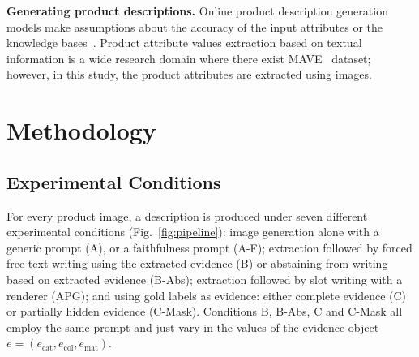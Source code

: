 \documentclass[runningheads]{llncs}
\newcommand{\cond}[1]{\textsf{#1}}
\begin{document}
\textbf{Generating product descriptions.} Online product description generation models make assumptions about the accuracy of the input attributes or the knowledge bases~\cite{chen2019kobe}. Product attribute values extraction based on textual information is a wide research domain where there exist MAVE~\cite{yang2022mave} dataset; however, in this study, the product attributes are extracted using images.
\section{Methodology}\label{sec:method}

\subsection{Experimental Conditions}
For every product image, a description is produced under seven different experimental conditions (Fig.~\ref{fig:pipeline}): image generation alone with a generic prompt (\cond{A}), or a faithfulness prompt (\cond{A-F}); extraction followed by forced free-text writing using the extracted evidence (\cond{B}) or abstaining from writing based on extracted evidence (\cond{B-Abs}); extraction followed by slot writing with a renderer (\cond{APG}); and using gold labels as evidence: either complete evidence (\cond{C}) or partially hidden evidence (\cond{C-Mask}). Conditions \cond{B}, \cond{B-Abs}, \cond{C} and \cond{C-Mask} all employ the same prompt and just vary in the values of the evidence object $e=(e_{\text{cat}},e_{\text{col}},e_{\text{mat}})$.
\end{document}
